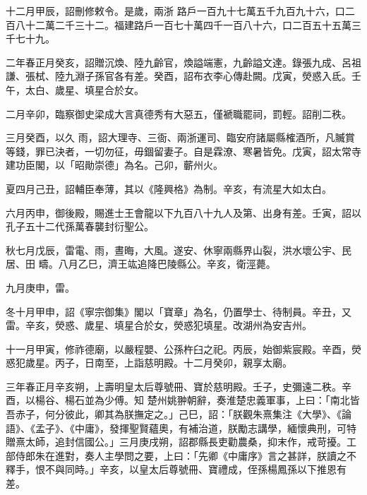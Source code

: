 \begin{pinyinscope}
 十二月甲辰，詔刪修敕令。是歲，兩浙
 路戶一百九十七萬五千九百九十六，口二百八十二萬二千三十二。福建路戶一百七十萬四千一百八十六，口二百五十五萬三千七十九。



 二年春正月癸亥，詔贈沉煥、陸九齡官，煥謚端憲，九齡謚文達。錄張九成、呂祖謙、張栻、陸九淵子孫官各有差。癸酉，詔布衣李心傳赴闕。戊寅，熒惑入氐。壬午，太白、歲星、填星合於女。



 二月辛卯，臨察御史梁成大言真德秀有大惡五，僅褫職罷祠，罰輕。詔削二秩。



 三月癸酉，以久
 雨，詔大理寺、三衙、兩浙運司、臨安府諸屬縣榷酒所，凡贓賞等錢，罪已決者，一切勿征，毋錮留妻子。自是霖潦、寒暑皆免。戊寅，詔太常寺建功臣閣，以「昭勛崇德」為名。己卯，蘄州火。



 夏四月己丑，詔輔臣奉薄，其以《隆興格》為制。辛亥，有流星大如太白。



 六月丙申，御後殿，賜進士王會龍以下九百八十九人及第、出身有差。壬寅，詔以孔子五十二代孫萬春襲封衍聖公。



 秋七月戊辰，雷電、雨，晝晦，大風。遂安、休寧兩縣界山裂，洪水壞公宇、民居、田
 疇。八月乙巳，濟王竑追降巴陵縣公。辛亥，衛涇薨。



 九月庚申，雷。



 冬十月甲申，詔《寧宗御集》閣以「寶章」為名，仍置學士、待制員。辛丑，又雷。辛亥，熒惑、歲星、填星合於女，熒惑犯填星。改湖州為安吉州。



 十一月甲寅，修祚德廟，以嚴程嬰、公孫杵臼之祀。丙辰，始御紫宸殿。辛酉，熒惑犯歲星。丙子，日南至，上詣慈明殿。十二月癸卯，親享太廟。



 三年春正月辛亥朔，上壽明皇太后尊號冊、寶於慈明殿。壬子，史彌遠二秩。辛酉，以楊谷、楊石並為少傅。知
 楚州姚翀朝辭，奏淮楚忠義軍事，上曰：「南北皆吾赤子，何分彼此，卿其為朕撫定之。」己巳，詔：「朕觀朱熹集注《大學》、《論語》、《孟子》、《中庸》，發揮聖賢蘊奧，有補治道，朕勵志講學，緬懷典刑，可特贈熹太師，追封信國公。」三月庚戌朔，詔郡縣長吏勸農桑，抑末作，戒苛擾。工部侍郎朱在進對，奏人主學問之要，上曰：「先卿《中庸序》言之甚詳，朕讀之不釋手，恨不與同時。」辛亥，以皇太后尊號冊、寶禮成，侄孫楊鳳孫以下推恩有差。




\end{pinyinscope}
